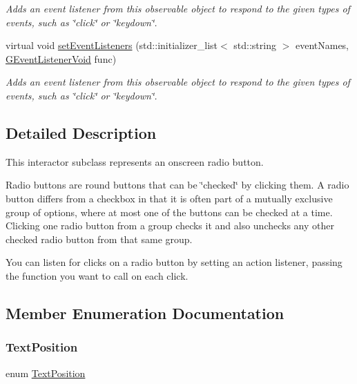 \begin{DoxyCompactItemize}
\begin{DoxyCompactList}\small\item\em Adds an event listener from this observable object to respond to the given types of events, such as \char`\"{}click\char`\"{} or \char`\"{}keydown\char`\"{}. \end{DoxyCompactList}\item 
virtual void \mbox{\hyperlink{classsgl_1_1GObservable_a7867184bbb686f74fae8a4db927da799}{set\+Event\+Listeners}} (std\+::initializer\+\_\+list$<$ std\+::string $>$ event\+Names, \mbox{\hyperlink{namespacesgl_a54427ce97bb1c2804e4fe2b0a62e8b17}{G\+Event\+Listener\+Void}} func)
\begin{DoxyCompactList}\small\item\em Adds an event listener from this observable object to respond to the given types of events, such as \char`\"{}click\char`\"{} or \char`\"{}keydown\char`\"{}. \end{DoxyCompactList}\end{DoxyCompactItemize}


\subsection{Detailed Description}
This interactor subclass represents an onscreen radio button. 

Radio buttons are round buttons that can be \char`\"{}checked\char`\"{} by clicking them. A radio button differs from a checkbox in that it is often part of a mutually exclusive group of options, where at most one of the buttons can be checked at a time. Clicking one radio button from a group checks it and also unchecks any other checked radio button from that same group.

You can listen for clicks on a radio button by setting an action listener, passing the function you want to call on each click. 

\subsection{Member Enumeration Documentation}
\mbox{\label{classsgl_1_1GInteractor_a8e0d441725a81d2bbdebbea09078260e}} 
\subsubsection{\texorpdfstring{Text\+Position}{TextPosition}}
{\footnotesize\ttfamily enum \mbox{\hyperlink{classsgl_1_1GInteractor_a8e0d441725a81d2bbdebbea09078260e}{Text\+Position}}\hspace{0.3cm}{\ttfamily [inherited]}}



